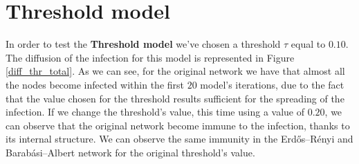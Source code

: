 
\section{Threshold model} %
\label{sec:threshold_model}

    In order to test the \textbf{Threshold model} we've chosen a threshold $\tau$ equal to $0.10$. The
    diffusion of the infection for this model is represented in Figure \ref{diff_thr_total}. As we can see, for the
    original network we have that almost all the nodes become infected within the first $20$ model's iterations,
    due to the fact that the value chosen for the threshold results sufficient for the spreading of the
    infection. If we change the threshold's value, this time using a value of $0.20$, we can observe that the
    original network become immune to the infection, thanks to its internal structure. We can observe
    the same immunity in the Erdős–Rényi and Barabási–Albert network for the original threshold's value.



